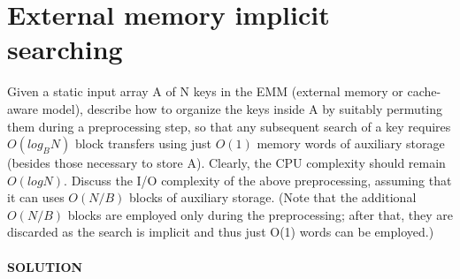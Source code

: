 \documentclass[a4paper]{article}
\begin{document}
\section*{External memory implicit searching}
Given a static input array A of N keys in the
EMM (external memory or cache-aware model), describe how to organize the keys
inside A by suitably permuting them during a preprocessing step, so that any subsequent
search of a key requires $O(log_B N)$ block transfers using just $O(1)$ memory words
of auxiliary storage (besides those necessary to store A). Clearly, the CPU complexity
should remain $O(log N)$. Discuss the I/O complexity of the above preprocessing,
assuming that it can uses $O(N/B)$ blocks of auxiliary storage. (Note that the additional
$O(N/B)$ blocks are employed only during the preprocessing; after that, they are
discarded as the search is implicit and thus just O(1) words can be employed.)
\\
\\
\textbf{SOLUTION}
\\
\\
\end{document}
